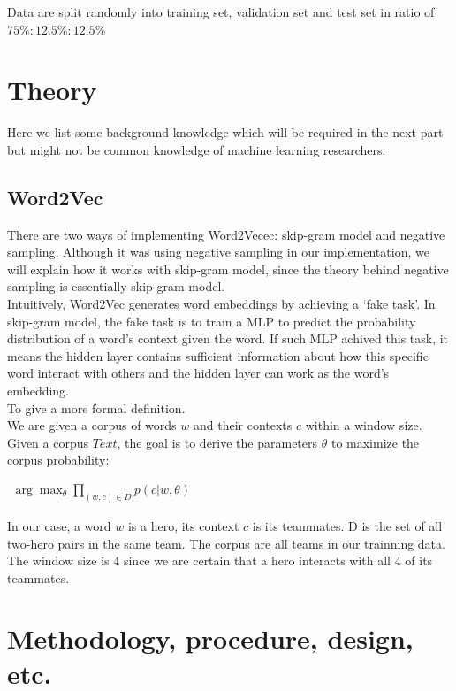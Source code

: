 \documentclass[12pt,openany,a4paper]{book}
\begin{document}
  Data are split randomly into training set, validation set and test set in ratio of $75\%:12.5\%:12.5\%$
  

\chapter{Theory}

Here we list some background knowledge which will be required in the next part but might not be common knowledge of machine learning researchers.
\section{Word2Vec}
There are two ways of implementing Word2Vecec\cite{mikolov2013efficient}: skip-gram model and negative sampling. Although it was using negative sampling in our implementation, we will explain how it works with skip-gram model, since the theory behind negative sampling is essentially skip-gram model.\\

Intuitively, Word2Vec generates word embeddings by achieving a `fake task'. In skip-gram model, the fake task is to train a MLP to predict the probability distribution of a word's context given the word. If such MLP achived this task, it means the hidden layer contains sufficient information about how this specific word interact with others and the hidden layer can work as the word's embedding.\\

To give a more formal definition. \\

We are given a corpus of words $w$ and their contexts $c$ within a window size. Given a corpus $Text$, the goal is to derive the parameters $\theta$ to maximize the corpus probability\cite{goldberg2014word2vec}:\\
\begin{center}
$\begin{aligned}
\arg\max_{\theta}\prod_{(w,c)\in D}p(c|w,\theta)
\end{aligned}$
\end{center}
In our case, a word $w$ is a hero, its context $c$ is its teammates. D is the set of all two-hero pairs in the same team. The corpus are all teams in our trainning data. The window size is 4 since we are certain that a hero interacts with all 4 of its teammates.

\chapter{Methodology, procedure, design, etc.}
\end{document}

